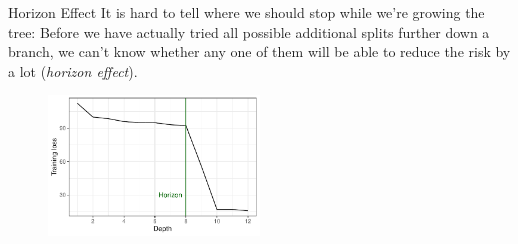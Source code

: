 \documentclass[11pt,compress,t,notes=noshow, xcolor=table]{beamer}
\begin{document}
\begin{vbframe}{Horizon Effect}
It is hard to tell where we should stop while we're growing the tree: Before we have actually tried all possible additional splits further down a branch, we can't know whether any one of them will be able to reduce the risk by a lot (\emph{horizon effect}).

\begin{figure}
\centering
\includegraphics[width=0.5\textwidth]{figure/horizon.pdf}
\end{figure}


\end{vbframe}

\end{document}

